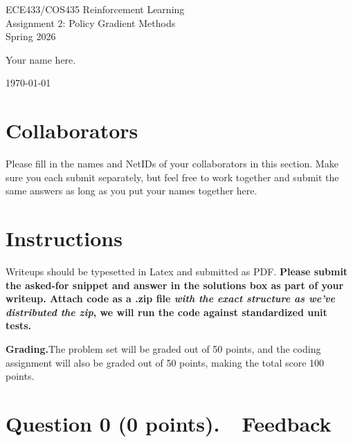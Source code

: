 \documentclass[11pt]{article}
\begin{document}
\begin{center}
{\LARGE ECE433/COS435 Reinforcement Learning \\[4pt]
Assignment 2: Policy Gradient Methods \\[4pt]
Spring 2026}

\vspace{12pt}
\begin{fillmein}
Your name here.
\end{fillmein}

\vspace{4pt}
\today
\end{center}

\section*{Collaborators}
\begin{fillmein}
Please fill in the names and NetIDs of your collaborators in this section.
Make sure you each submit separately, but feel free to work together and
submit the same answers as long as you put your names together here.
\end{fillmein}

\section*{Instructions}

Writeups should be typesetted in Latex and submitted as PDF.
\textbf{Please submit the asked-for snippet and answer in the solutions box
as part of your writeup.  Attach code as a .zip file
\emph{with the exact structure as we've distributed the zip}, we will run
the code against standardized unit tests.}

\textbf{Grading.}\quad The problem set will be graded out of 50 points,
and the coding assignment will also be graded out of 50 points,
making the total score 100 points.

\section*{Question 0 (0 points).\ \ Feedback}
\end{document}
